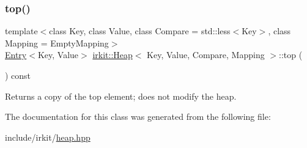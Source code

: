 \mbox{\label{classirkit_1_1Heap_aa14c398611006aa94e2fe24be3cf34ec}} 
\subsubsection{\texorpdfstring{top()}{top()}}
{\footnotesize\ttfamily template$<$class Key, class Value, class Compare = std\+::less$<$\+Key$>$, class Mapping = Empty\+Mapping$>$ \\
\mbox{\hyperlink{structirkit_1_1Entry}{Entry}}$<$Key, Value$>$ \mbox{\hyperlink{classirkit_1_1Heap}{irkit\+::\+Heap}}$<$ Key, Value, Compare, Mapping $>$\+::top (\begin{DoxyParamCaption}{ }\end{DoxyParamCaption}) const\hspace{0.3cm}{\ttfamily [inline]}}



Returns a copy of the top element; does not modify the heap. 



The documentation for this class was generated from the following file\+:\begin{DoxyCompactItemize}
\item 
include/irkit/\mbox{\hyperlink{heap_8hpp}{heap.\+hpp}}\end{DoxyCompactItemize}
